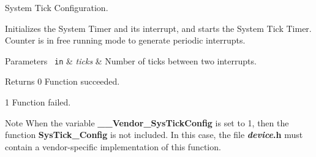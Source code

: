 System Tick Configuration. 

Initializes the System Timer and its interrupt, and starts the System Tick Timer. Counter is in free running mode to generate periodic interrupts. 
\begin{DoxyParams}[1]{Parameters}
\mbox{\texttt{ in}}  & {\em ticks} & Number of ticks between two interrupts. \\
\hline
\end{DoxyParams}
\begin{DoxyReturn}{Returns}
0 Function succeeded. 

1 Function failed. 
\end{DoxyReturn}
\begin{DoxyNote}{Note}
When the variable {\bfseries{\+\_\+\+\_\+\+Vendor\+\_\+\+Sys\+Tick\+Config}} is set to 1, then the function {\bfseries{Sys\+Tick\+\_\+\+Config}} is not included. In this case, the file {\bfseries{{\itshape device}.h}} must contain a vendor-\/specific implementation of this function. 
\end{DoxyNote}
